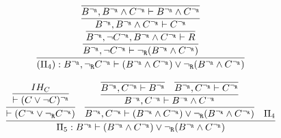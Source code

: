 \begin{enumerate}[(i)]
\begin{itemize}
            $$
                \infer{
                    (\Pi_4) : B^{\neg_\R}, \neg_\R C^{\neg_\R} \vdash (B^{\neg_\R} \wedge C^{\neg_\R}) \vee \neg_\R(B^{\neg_\R} \wedge C^{\neg_\R})
                }{
                    \infer{
                        B^{\neg_\R}, \neg C^{\neg_\R} \vdash \neg_\R(B^{\neg_\R} \wedge C^{\neg_\R})
                    }{
                        \infer{
                            B^{\neg_\R}, \neg C^{\neg_\R}, B^{\neg_\R} \wedge C^{\neg_\R} \vdash R
                        }{
                            \infer{
                                B^{\neg_\R}, B^{\neg_\R} \wedge C^{\neg_\R} \vdash C^{\neg_\R}
                            }{
                                \infer{
                                    B^{\neg_\R}, B^{\neg_\R} \wedge C^{\neg_\R} \vdash B^{\neg_\R} \wedge C^{\neg_\R}
                                }{
                                }
                            }
                        }
                    }
                }
            $$


            $$
            \infer{
                \Pi_5 : B^{\neg_\R} \vdash (B^{\neg_\R} \wedge C^{\neg_\R}) \vee \neg_\R(B^{\neg_\R} \wedge C^{\neg_\R})
            }{
                \infer{
                    \vdash (C^{\neg_\R} \vee \neg_\R C^{\neg_\R})
                }{
                    \infer{
                        \vdash (C \vee \neg C)^{\neg_\R}
                    }{
                        IH_C
                    }
                }&
                \infer{
                    B^{\neg_\R}, C^{\neg_\R} \vdash (B^{\neg_\R} \wedge C^{\neg_\R}) \vee \neg_\R(B^{\neg_\R} \wedge C^{\neg_\R})
                }{
                    \infer{
                        B^{\neg_\R}, C^{\neg_\R} \vdash B^{\neg_\R} \wedge C^{\neg_\R}
                    }{
                        \infer{
                            B^{\neg_\R}, C^{\neg_\R} \vdash B^{\neg_\R}
                        }{
                        }&
                        \infer{
                            B^{\neg_\R}, C^{\neg_\R} \vdash C^{\neg_\R}
                        }{
                        }
                    }
                }&
                \Pi_4
            }
            $$


\end{itemize}
\end{enumerate}
